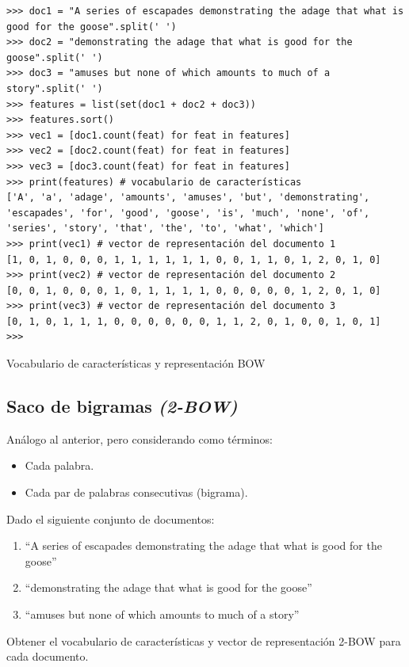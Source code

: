 \begin{listing}[htbp]
\begin{verbatim}
>>> doc1 = "A series of escapades demonstrating the adage that what is good for the goose".split(' ')
>>> doc2 = "demonstrating the adage that what is good for the goose".split(' ')
>>> doc3 = "amuses but none of which amounts to much of a story".split(' ')
>>> features = list(set(doc1 + doc2 + doc3))
>>> features.sort()
>>> vec1 = [doc1.count(feat) for feat in features]
>>> vec2 = [doc2.count(feat) for feat in features]
>>> vec3 = [doc3.count(feat) for feat in features]
>>> print(features) # vocabulario de características
['A', 'a', 'adage', 'amounts', 'amuses', 'but', 'demonstrating', 'escapades', 'for', 'good', 'goose', 'is', 'much', 'none', 'of', 'series', 'story', 'that', 'the', 'to', 'what', 'which']
>>> print(vec1) # vector de representación del documento 1
[1, 0, 1, 0, 0, 0, 1, 1, 1, 1, 1, 1, 0, 0, 1, 1, 0, 1, 2, 0, 1, 0]
>>> print(vec2) # vector de representación del documento 2
[0, 0, 1, 0, 0, 0, 1, 0, 1, 1, 1, 1, 0, 0, 0, 0, 0, 1, 2, 0, 1, 0]
>>> print(vec3) # vector de representación del documento 3
[0, 1, 0, 1, 1, 1, 0, 0, 0, 0, 0, 0, 1, 1, 2, 0, 1, 0, 0, 1, 0, 1]
>>> 
\end{verbatim}
\caption{Vocabulario de características y representación BOW}
\label{lst:vocab-feat-BOW}
\end{listing}

\subsection{Saco de bigramas \emph{(2-BOW)}}

Análogo al anterior, pero considerando como términos:
\begin{itemize}
\item Cada palabra.
\item Cada par de palabras consecutivas (bigrama).
\end{itemize}

\begin{example}\label{exa:ml-2bow}
Dado el siguiente conjunto de documentos:
\begin{enumerate}
\item ``A series of escapades demonstrating the adage that what is good for the goose''
\item ``demonstrating the adage that what is good for the goose''
\item ``amuses but none of which amounts to much of a story''
\end{enumerate}
Obtener el vocabulario de características y vector de representación 2-BOW para cada documento.
\end{example}

